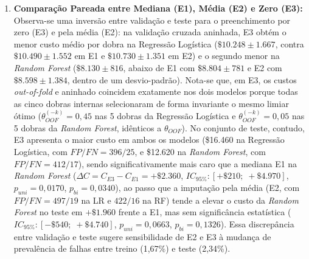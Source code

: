 \documentclass[conference]{IEEEtran}
\begin{document}
\begin{enumerate}
    \item \textbf{Comparação Pareada entre Mediana (E1), Média (E2) e Zero (E3):} Observa-se uma inversão entre validação e teste para o preenchimento por zero (E3) e pela média (E2): na validação cruzada aninhada, E3 obtém o menor custo médio por dobra na Regressão Logística ($\$10.248 \pm 1.667$, contra $\$10.490 \pm 1.552$ em E1 e $\$10.730 \pm 1.351$ em E2) e o segundo menor na \textit{Random Forest} ($\$8.130 \pm 816$, abaixo de E1 com $\$8.804 \pm 781$ e E2 com $\$8.598 \pm 1.384$, dentro de um desvio-padrão). Nota-se que, em E3, os custos \textit{out-of-fold} e aninhado coincidem exatamente nos dois modelos porque todas as cinco dobras internas selecionaram de forma invariante o mesmo limiar ótimo ($\theta^{(-k)}_{OOF} = 0{,}45$ nas 5 dobras da Regressão Logística e $\theta^{(-k)}_{OOF} = 0{,}05$ nas 5 dobras da \textit{Random Forest}, idênticos a $\theta_{OOF}$). No conjunto de teste, contudo, E3 apresenta o maior custo em ambos os modelos (\$16.460 na Regressão Logística, com $FP/FN = 396/25$, e \$12.620 na \textit{Random Forest}, com $FP/FN = 412/17$), sendo significativamente mais caro que a mediana E1 na \textit{Random Forest} ($\Delta C = C_{E3} - C_{E1} = +\$2.360$, $IC_{95\%}: [+\$210;\; +\$4.970]$, $p_{uni} = 0{,}0170$, $p_{bi} = 0{,}0340$), ao passo que a imputação pela média (E2, com $FP/FN = 497/19$ na LR e $422/16$ na RF) tende a elevar o custo da \textit{Random Forest} no teste em $+\$1.960$ frente a E1, mas sem significância estatística ($IC_{95\%}: [-\$540;\; +\$4.740]$, $p_{uni} = 0{,}0663$, $p_{bi} = 0{,}1326$). Essa discrepância entre validação e teste sugere sensibilidade de E2 e E3 à mudança de prevalência de falhas entre treino (1,67\%) e teste (2,34\%).

\end{enumerate}
\end{document}
